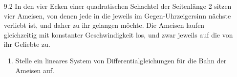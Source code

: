 \documentclass{../HM}
\begin{document}
	\begin{enumerate}
		\item [9.2] In den vier Ecken einer quadratischen Schachtel der Seitenlänge 2 sitzen vier Ameisen, von denen jede in die jeweils im Gegen-Uhrzeigersinn nächste verliebt ist, und daher zu ihr gelangen möchte. Die Ameisen laufen gleichzeitig mit konstanter Geschwindigkeit los, und zwar jeweils auf die von ihr Geliebte zu.
		\begin{enumerate}
			\item Stelle ein lineares System von Differentialgleichungen für die Bahn der Ameisen auf.
			\begin{eqnn}
			\end{eqnn}
			

\end{enumerate}
\end{enumerate}
\end{document}
